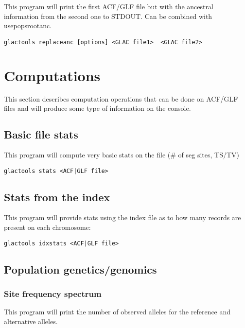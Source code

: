 \documentclass[a4paper]{article}
\begin{document}
\noindent This program will print the first ACF/GLF file but with the ancestral information from the second one to STDOUT. Can be combined with usepopsrootanc.

\begin{lstlisting}
glactools replaceanc [options] <GLAC file1>  <GLAC file2>
\end{lstlisting}




\newpage

\section{Computations}

This section describes computation operations that can be done on ACF/GLF files and will produce some type of information on the console.



\subsection{Basic file stats}

 This program will compute very basic stats on the file (\# of seg sites, TS/TV)

\begin{lstlisting}
glactools stats <ACF|GLF file>
\end{lstlisting}


\subsection{Stats from the index}

\noindent This program will provide stats using the index file as to how many records are present on each chromosome:

\begin{lstlisting}
glactools idxstats <ACF|GLF file>
\end{lstlisting}


\subsection{Population genetics/genomics}

\subsubsection{Site frequency spectrum}

This program will print the number of observed alleles for the reference and alternative alleles.
\end{document}

